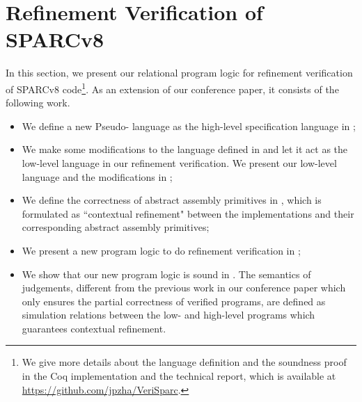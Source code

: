\section{Refinement Verification of SPARCv8}
\label{sec:refine-verification-sparc}

In this section, we present our relational
program logic for refinement verification of
SPARCv8 code\footnote{We give more details about the 
language definition and the soundness proof
in the Coq implementation and the technical report, 
which is available at \url{https://github.com/jpzha/VeriSparc}.}. 
As an extension of our conference paper,
it consists of the following work.
\begin{itemize}
    \item We define a new Pseudo-\sparc{} language
        as the high-level
        specification language in
        \Subsec{\ref{subsec:High-level Pseudo-SPARCv8 Language}};
    \item We make some modifications to the \sparc{}
        language defined in \Subsec{\ref{sec:modeling}} and
        let it act as the low-level language in our refinement
        verification. We present our low-level \sparc{}
        language and the modifications in
        \Subsec{\ref{subsec:low-level SPARCv8 Program}};
    \item We define the correctness of abstract
        assembly primitives in
        \Subsec{\ref{subsec:correctness-primitive}},
        which is formulated as ``contextual refinement"
        between the implementations and their
        corresponding abstract assembly primitives;
    \item We present a new program logic to do
        refinement verification in
        \Subsec{\ref{subsec:rellogic}};
    \item We show that our new program logic is
        sound in \Subsec{\ref{subsec:semantics and soundness}}.
        The semantics of judgements,
        different from the previous work
        in our conference paper which only ensures the
        partial correctness of verified programs,
        are defined as simulation relations
        between the low- and high-level programs
        which guarantees contextual refinement.
\end{itemize}

